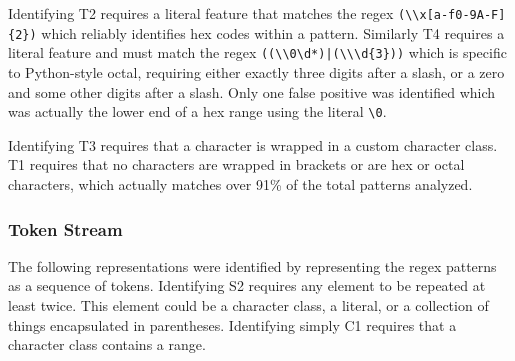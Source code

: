 

Identifying T2 requires a literal feature that matches the regex \verb!(\\x[a-f0-9A-F]{2})! which reliably identifies hex codes within a pattern.  
Similarly T4 requires a literal feature and must match the regex \verb!((\\0\d*)|(\\\d{3}))! which is specific to Python-style octal, requiring either exactly three digits after a slash, or a zero and some other digits after a slash.  Only one false positive was identified which was actually the lower end of a hex range using the literal \verb!\0!.

Identifying T3 requires that a character is wrapped in a custom character class. 
 T1 requires that no characters are wrapped in brackets or are hex or octal characters, which actually matches over 91\% of the total patterns analyzed.

\subsubsection{Token Stream }
The following representations were identified by representing the regex patterns as a sequence of tokens. 
Identifying S2 requires any element to be repeated at least twice. This element could be a character class, a literal, or a collection of things encapsulated in parentheses. 
Identifying simply C1 requires that a character class contains a range. 


